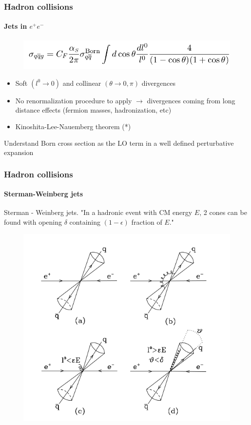 \documentclass[aspectratio=43]{beamer}
\begin{document}
\begin{frame}

	\frametitle{Hadron collisions}
	\framesubtitle{Jets in $e^{+}e^{-}$}
	
	\begin{figure}
		\includegraphics[width = 9.5 cm]{plots/eq_qqbg.png}
	\end{figure}

	\begin{itemize}
		\item Soft $(l^{0} \rightarrow 0)$ and collinear $(\theta \rightarrow 0, \pi)$ divergences
		\item No renormalization procedure to apply $\rightarrow$ divergences coming from long distance effects (fermion masses, hadronization, etc)
		\item Kinoshita-Lee-Nauemberg theorem {\color{blue}(*)}
	\end{itemize}

	{\color{blue}Understand Born cross section as the LO term in a well defined perturbative expansion}
	
\end{frame}

\begin{frame}

	\frametitle{Hadron collisions}
	\framesubtitle{Sterman-Weinberg jets}
	
	Sterman - Weinberg jets. "In a hadronic event with CM energy $E$, 2 cones can be found with opening $\delta$ containing $(1 - \epsilon)$ fraction of $E$."
	
	\begin{figure}
		\includegraphics[width = 7 cm]{plots/SW_jets.png}
	\end{figure}

\end{frame}
\end{document}
